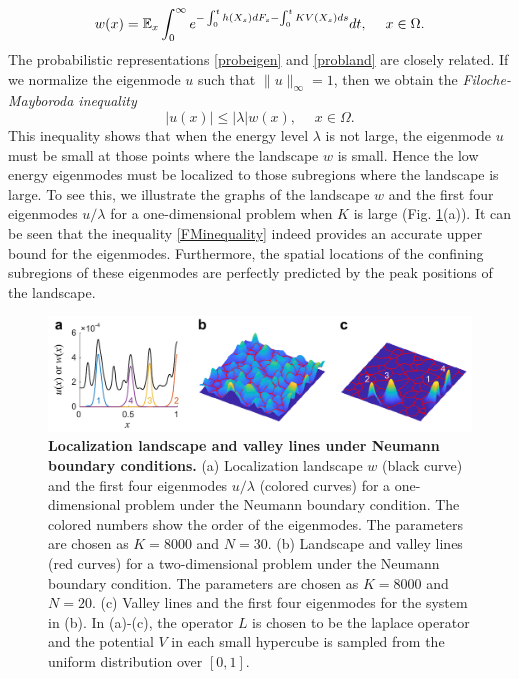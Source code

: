 \documentclass[a4paper,11pt]{article}
\begin{document}
\begin{equation}\label{probland}
w(x) = \mathbb{E}_x \int_{0}^{\infty} e^{- \int_{0}^{t} h(X_s) d F_s - \int_{0}^{t} KV(X_s) ds} dt, \quad \; x \in \Omega.
\end{equation}
The probabilistic representations \eqref{probeigen} and \eqref{probland} are closely related. If we normalize the eigenmode $u$ such that $\|u\|_\infty = 1$, then we obtain the \emph{Filoche-Mayboroda inequality}
\begin{equation}\label{FMinequality}
|u(x)| \leq |\lambda| w(x), \quad \; x \in \Omega.
\end{equation}
This inequality shows that when the energy level $\lambda$ is not large, the eigenmode $u$ must be small at those points where the landscape $w$ is small. Hence the low energy eigenmodes must be localized to those subregions where the landscape is large. To see this, we illustrate the graphs of the landscape $w$ and the first four eigenmodes $u/\lambda$ for a one-dimensional problem when $K$ is large (Fig. \ref{fig1}(a)). It can be seen that the inequality \eqref{FMinequality} indeed provides an accurate upper bound for the eigenmodes. Furthermore, the spatial locations of the confining subregions of these eigenmodes are perfectly predicted by the peak positions of the landscape.
\begin{figure}
\centering\includegraphics[width=\linewidth]{Fig1}
\caption{\textbf{Localization landscape and valley lines under Neumann boundary conditions.} (a) Localization landscape $w$ (black curve) and the first four eigenmodes $u/\lambda$ (colored curves) for a one-dimensional problem under the Neumann boundary condition. The colored numbers show the order of the eigenmodes. The parameters are chosen as $K = 8000$ and $N = 30$. (b) Landscape and valley lines (red curves) for a two-dimensional problem under the Neumann boundary condition. The parameters are chosen as $K = 8000$ and $N = 20$. (c) Valley lines and the first four eigenmodes for the system in (b). In (a)-(c), the operator $L$ is chosen to be the laplace operator and the potential $V$ in each small hypercube is sampled from the uniform distribution over $[0,1]$. }
\label{fig1}
\end{figure}
\end{document}

